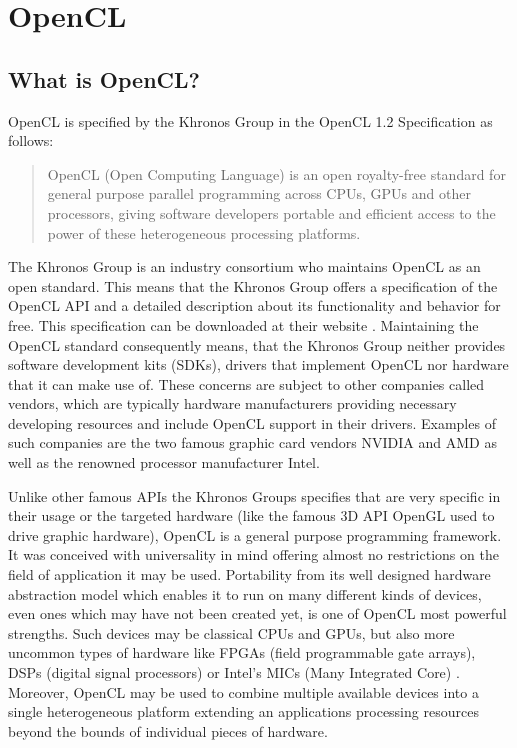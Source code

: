 \section{OpenCL}

\subsection{What is OpenCL?}
OpenCL is specified by the Khronos Group in the OpenCL 1.2 Specification as follows:

\begin{quotation}
OpenCL (Open Computing Language) is an open royalty-free standard for general purpose
parallel programming across CPUs, GPUs and other processors, giving software developers
portable and efficient access to the power of these heterogeneous processing platforms. \cite{opencl_spec}
\end{quotation}

The Khronos Group is an industry consortium who maintains OpenCL as an open standard. This means that the Khronos Group offers a specification of the OpenCL API and a detailed description about its functionality and behavior for free. This specification can be downloaded at their website \cite{opencl_spec}. Maintaining the OpenCL standard consequently means, that the Khronos Group neither provides software development kits (SDKs), drivers that implement OpenCL nor hardware that it can make use of. These concerns are subject to other companies called vendors, which are typically hardware manufacturers providing necessary developing resources and include OpenCL support in their drivers. Examples of such companies are the two famous graphic card vendors NVIDIA and AMD as well as the renowned processor manufacturer Intel.

Unlike other famous APIs the Khronos Groups specifies that are very specific in their usage or the targeted hardware (like the famous 3D API OpenGL used to drive graphic hardware), OpenCL is a general purpose programming framework. It was conceived with universality in mind offering almost no restrictions on the field of application it may be used. Portability from its well designed hardware abstraction model which enables it to run on many different kinds of devices, even ones which may have not been created yet, is one of OpenCL most powerful strengths. Such devices may be classical CPUs and GPUs, but also more uncommon types of hardware like FPGAs (field programmable gate arrays), DSPs (digital signal processors) or Intel's MICs (Many Integrated Core) \cite{mic}. Moreover, OpenCL may be used to combine multiple available devices into a single heterogeneous platform extending an applications processing resources beyond the bounds of individual pieces of hardware.

